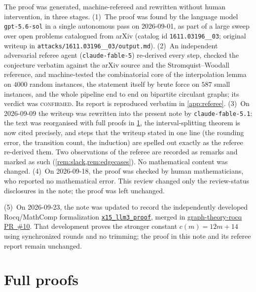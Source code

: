 \documentclass[11pt,a4paper]{article}
\theoremstyle{plain}
\theoremstyle{definition}
\theoremstyle{remark}
\begin{document}
The proof was generated, machine-refereed and rewritten without human intervention, in three stages.
(1)~The proof was found by the language model \texttt{gpt-5.6-sol} in a single autonomous pass on 2026-09-01, as part of a large sweep over open problems catalogued from arXiv (catalog id \texttt{1611.03196\_\_03}; original writeup in \texttt{attacks/1611.03196\_\_03/output.md}).
(2)~An independent adversarial referee agent (\texttt{claude-fable-5}) re-derived every step, checked the conjecture verbatim against the arXiv source and the Stromquist--Woodall reference, and machine-tested the combinatorial core of the interpolation lemma on $4000$ random instances, the statement itself by brute force on $587$ small instances, and the whole pipeline end to end on bipartite circulant graphs; its verdict was \textsc{confirmed}. Its report is reproduced verbatim in \cref{app:referee}.
(3)~On 2026-09-09 the writeup was rewritten into the present note by \texttt{claude-fable-5.1}: the text was reorganised with full proofs in \cref{app:proofs}, the interval-splitting theorem is now cited precisely, and steps that the writeup stated in one line (the rounding error, the transition count, the induction) are spelled out exactly as the referee re-derived them. Two observations of the referee are recorded as remarks and marked as such (\cref{rem:slack,rem:edgecases}). No mathematical content was changed.
(4)~On 2026-09-18, the proof was checked by human mathematicians, who reported no mathematical error. This review changed only the review-status disclosures in the note; the proof was left unchanged.

(5)~On 2026-09-23, the note was updated to record the independently developed Rocq/MathComp formalization \href{https://github.com/graph-theory-AI/graph-theory-rocq/blob/main/packing-theory/theories/foundations/fair_matching.v}{\texttt{x15\_llm3\_proof}}, merged in \href{https://github.com/graph-theory-AI/graph-theory-rocq/pull/10}{graph-theory-rocq PR~\#10}. That development proves the stronger constant $c(m)=12m+14$ using synchronized rounds and no trimming; the proof in this note and its referee report remain unchanged.


\appendix

\section{Full proofs}\label{app:proofs}
\end{document}
